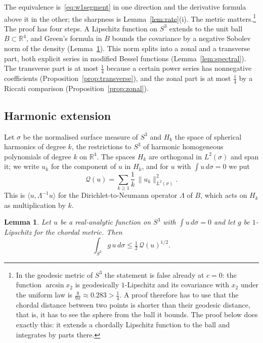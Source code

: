 \documentclass[aps,prd,twocolumn,superscriptaddress,nofootinbib,longbibliography,floatfix,amsmath,amssymb,10pt]{revtex4-2}
\newtheorem{lemma}[theorem]{Lemma}
\theoremstyle{definition}
\theoremstyle{remark}
\newcommand{\R}{\mathbb{R}}
\newcommand{\ip}[2]{\langle #1,#2\rangle}
\begin{document}
The equivalence is~\eqref{eq:w1segment} in one direction and the derivative
formula above it in the other; the sharpness is Lemma~\ref{lem:rate}(i). The
metric matters.\footnote{In the geodesic metric of $S^3$ the statement is
false already at $c=0$: the function $\arcsin x_2$ is geodesically
$1$-Lipschitz and its covariance with $x_2$ under the uniform law is
$\frac8{9\pi}\approx0.283>\frac14$. A proof therefore has to use that the
chordal distance between two points is shorter than their geodesic distance,
that is, it has to see the sphere from the ball it bounds. The proof below
does exactly this: it extends a chordally Lipschitz function to the ball and
integrates by parts there.} The proof has four steps. A Lipschitz function
on $S^3$ extends to the unit ball $B\subset\R^4$, and Green's formula in $B$
bounds the covariance by a negative Sobolev norm of the density
(Lemma~\ref{lem:harmonic}). This norm splits into a zonal and a transverse
part, both explicit series in modified Bessel functions
(Lemma~\ref{lem:spectral}). The transverse part is at most $\frac14$ because a
certain power series has nonnegative coefficients
(Proposition~\ref{prop:transverse}), and the zonal part is at most $\frac14$
by a Riccati comparison (Proposition~\ref{prop:zonal}).

\subsection{Harmonic extension}

Let $\sigma$ be the normalised surface measure of $S^3$ and $H_k$ the space
of spherical harmonics of degree $k$, the restrictions to $S^3$ of harmonic
homogeneous polynomials of degree $k$ on $\R^4$. The spaces $H_k$ are
orthogonal in $L^2(\sigma)$ and span it; we write $u_k$ for the component of
$u$ in $H_k$, and for $u$ with $\int u\,d\sigma=0$ we put
\begin{equation}\label{eq:Qnorm}
\mathcal Q(u)=\sum_{k\ge1}\frac1k\,\|u_k\|_{L^2(\sigma)}^2 .
\end{equation}
This is $\ip u{\Lambda^{-1}u}$ for the Dirichlet-to-Neumann operator
$\Lambda$ of $B$, which acts on $H_k$ as multiplication by $k$.

\begin{lemma}\label{lem:harmonic}
Let $u$ be a real-analytic function on $S^3$ with $\int u\,d\sigma=0$ and let
$g$ be $1$-Lipschitz for the chordal metric. Then
\[
\int_{S^3}g\,u\,d\sigma\le\tfrac12\,\mathcal Q(u)^{1/2}.
\]
\end{lemma}
\end{document}
